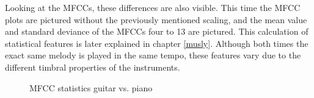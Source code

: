\FloatBarrier
Looking at the MFCCs, these differences are also visible.
This time the MFCC plots are pictured without the previously mentioned scaling, and the mean value and standard deviance of the MFCCs four to 13 are pictured. This calculation of statistical features is later explained in chapter \ref{musly}. Although both times the exact same melody is played in the same tempo, these features vary due to the different timbral properties of the instruments. 
\begin{figure}[htbp]
	\centering
	\caption{MFCC statistics guitar vs. piano}	
	\label{fig:timbrmfcce}
\end{figure}
\FloatBarrier

